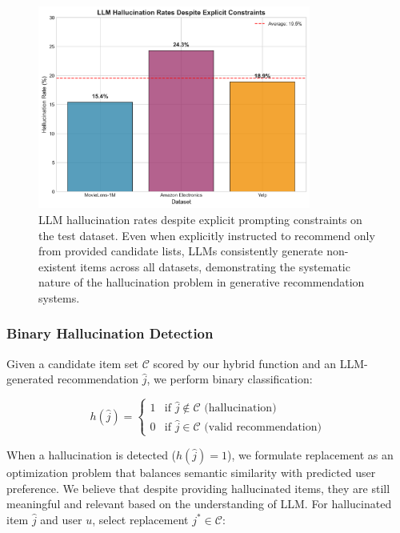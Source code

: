 \documentclass[acmsmall]{acmart}
\begin{document}
\begin{figure}[h]
\centering
\includegraphics[width=0.8\textwidth]{llm_hallucination_evidence.png}
\caption{LLM hallucination rates despite explicit prompting constraints on the test dataset. Even when explicitly instructed to recommend only from provided candidate lists, LLMs consistently generate non-existent items across all datasets, demonstrating the systematic nature of the hallucination problem in generative recommendation systems.}
\label{fig:llm_hallucination_evidence}
\end{figure}
\subsubsection{Binary Hallucination Detection}

Given a candidate item set $\mathcal{C}$ scored by our hybrid function and an LLM-generated recommendation $\hat{j}$, we perform binary classification:

\begin{equation}
h(\hat{j}) = \begin{cases}
1 & \text{if } \hat{j} \notin \mathcal{C} \text{ (hallucination)} \\
0 & \text{if } \hat{j} \in \mathcal{C} \text{ (valid recommendation)}
\end{cases}
\label{eq:hallucination_detection}
\end{equation}



When a hallucination is detected ($h(\hat{j}) = 1$), we formulate replacement as an optimization problem that balances semantic similarity with predicted user preference. We believe that despite providing hallucinated items, they are still meaningful and relevant based on the understanding of LLM. 
For hallucinated item $\hat{j}$ and user $u$, select replacement $j^* \in \mathcal{C}$:
\end{document}
